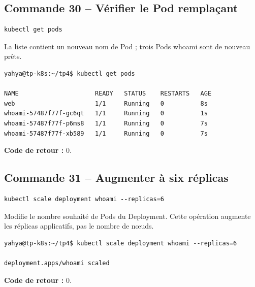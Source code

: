 \documentclass[11pt,a4paper]{article}
\begin{document}
\subsection{Commande 30 -- Vérifier le Pod remplaçant}
\begin{lstlisting}
kubectl get pods
\end{lstlisting}
La liste contient un nouveau nom de Pod ; trois Pods whoami sont de nouveau prêts.
\begin{tcolorbox}[terminal,title={Ubuntu / WSL2 -- Commande 30 -- rendu reconstitué}]
\begin{Verbatim}[fontsize=\scriptsize,breaklines=true,breakanywhere=true,breaksymbolleft={},breaksymbolright={}]
yahya@tp-k8s:~/tp4$ kubectl get pods

NAME                     READY   STATUS    RESTARTS   AGE
web                      1/1     Running   0          8s
whoami-57487f77f-gc6qt   1/1     Running   0          1s
whoami-57487f77f-p6ms8   1/1     Running   0          7s
whoami-57487f77f-xb589   1/1     Running   0          7s
\end{Verbatim}
\end{tcolorbox}
\textbf{Code de retour :} 0.

\subsection{Commande 31 -- Augmenter à six réplicas}
\begin{lstlisting}
kubectl scale deployment whoami --replicas=6
\end{lstlisting}
Modifie le nombre souhaité de Pods du Deployment. Cette opération augmente les réplicas applicatifs, pas le nombre de nœuds.
\begin{tcolorbox}[terminal,title={Ubuntu / WSL2 -- Commande 31 -- rendu reconstitué}]
\begin{Verbatim}[fontsize=\scriptsize,breaklines=true,breakanywhere=true,breaksymbolleft={},breaksymbolright={}]
yahya@tp-k8s:~/tp4$ kubectl scale deployment whoami --replicas=6

deployment.apps/whoami scaled
\end{Verbatim}
\end{tcolorbox}
\textbf{Code de retour :} 0.
\end{document}
